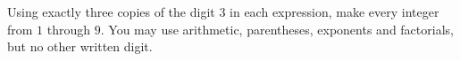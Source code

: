 Using exactly three copies of the digit $3$ in each expression, make every integer from $1$ through $9$. You may use arithmetic, parentheses, exponents and factorials, but no other written digit.
